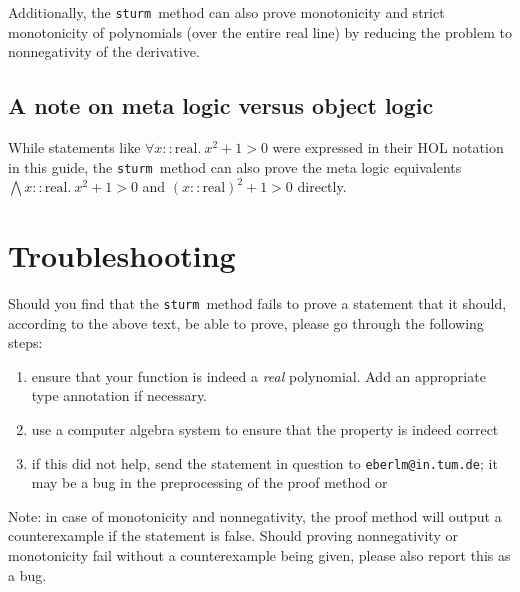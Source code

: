 \documentclass[11pt,a4paper,oneside]{article}
\newcommand{\sturm}{\texttt{sturm}}
\newcommand{\real}{\textrm{real}}
\begin{document}
Additionally, the \sturm\ method can also prove monotonicity and strict monotonicity of polynomials (over the entire real line) by reducing the problem to nonnegativity of the derivative.

\subsection{A note on meta logic versus object logic}

While statements like $\forall x::\real.\ x^2+1>0$ were expressed in their HOL notation in this guide, the \sturm\ method can also prove the meta logic equivalents $\bigwedge x::\real.\ x^2+1>0$ and $(x::\real)^2+1>0$ directly.

\section{Troubleshooting}

Should you find that the \sturm\ method fails to prove a statement that it should, according to the above text, be able to prove, please go through the following steps:
\begin{enumerate}
\item ensure that your function is indeed a \emph{real} polynomial. Add an appropriate type annotation if necessary.
\item use a computer algebra system to ensure that the property is indeed correct
\item if this did not help, send the statement in question to \texttt{eberlm@in.tum.de}; it may be a bug in the preprocessing of the proof method or
\end{enumerate}

Note: in case of monotonicity and nonnegativity, the proof method will output a counterexample if the statement is false. Should proving nonnegativity or monotonicity fail without a counterexample being given, please also report this as a bug.
\end{document}
